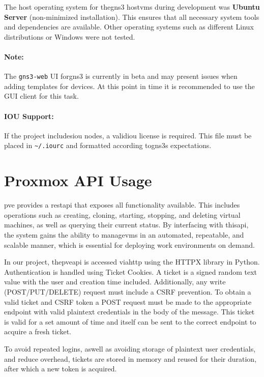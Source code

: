     The host operating system for the\ac{gns3} host\ac{vm}s during development was \textbf{Ubuntu Server} (non-minimized 
    installation). This ensures that all necessary system tools and dependencies are available. Other operating systems 
    such as different Linux distributions or Windows were not tested.    

    \paragraph{Note:} The \texttt{gns3-web} UI for\ac{gns3} is currently in beta and may present issues when adding 
    templates for devices. At this point in time it is recommended to use the GUI client for this task.

    \paragraph{IOU Support:} If the project includes\ac{iou} nodes, a valid\ac{iou} license is required. This file must be 
    placed in \texttt{\textasciitilde{}/.iourc} and formatted according to\ac{gns3}s expectations.

\section{Proxmox API Usage}

    \ac{pve} provides a \ac{rest}\ac{api} that exposes all functionality available. This includes operations such as 
    creating, cloning, starting, stopping, and deleting virtual machines, as well as querying their current status. 
    By interfacing with this\ac{api}, the system gains the ability to manage\ac{vm}s in an automated, repeatable, and 
    scalable manner, which is essential for deploying work environments on demand.

    In our project, the\ac{pve}\ac{api} is accessed via\ac{http} using the HTTPX library in Python. 
    Authentication is handled using Ticket Cookies. A ticket is a signed random text value with the user and creation 
    time included. Additionally, any write (POST/PUT/DELETE) request must include a CSRF prevention. To obtain a valid 
    ticket and CSRF token a POST request must be made to the appropriate endpoint with valid plaintext credentials in the 
    body of the message. This ticket is valid for a set amount of time and itself can be sent to the correct endpoint to 
    acquire a fresh ticket.

    To avoid repeated logins, aswell as avoiding storage of plaintext user credentials, and reduce overhead, tickets are 
    stored in memory and reused for their duration, after which a new token is acquired.

